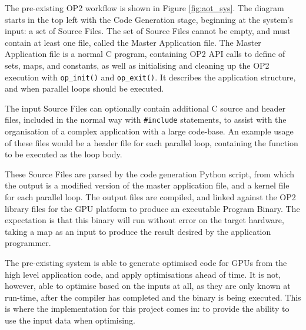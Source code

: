 \noindent The pre-existing OP2 workflow is shown in Figure \ref{fig:aot_sys}. The diagram starts in the top left with the Code Generation stage, beginning at the system's input: a set of Source Files. The set of Source Files cannot be empty, and must contain at least one file, called the Master Application file. The Master Application file is a normal C program, containing OP2 API calls to define of sets, maps, and constants, as well as initialising and cleaning up the OP2 execution with \verb|op_init()| and \verb|op_exit()|. It describes the application structure, and when parallel loops should be executed.
\par
The input Source Files can optionally contain additional C source and header files, included in the normal way with \verb|#include| statements, to assist with the organisation of a complex application with a large code-base. An example usage of these files would be a header file for each parallel loop, containing the function to be executed as the loop body.
\par
These Source Files are parsed by the code generation Python script, from which the output is a modified version of the master application file, and a kernel file for each parallel loop. The output files are compiled, and linked against the OP2 library files for the GPU platform to produce an executable Program Binary. The expectation is that this binary will run without error on the target hardware, taking a map as an input to produce the result desired by the application programmer.
\par
The pre-existing system is able to generate optimised code for GPUs from the high level application code, and apply optimisations ahead of time. It is not, however, able to optimise based on the inputs at all, as they are only known at run-time, after the compiler has completed and the binary is being executed. This is where the implementation for this project comes in: to provide the ability to use the input data when optimising.

